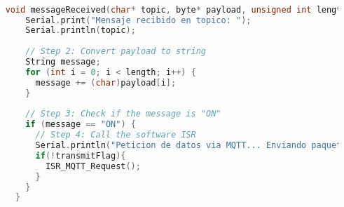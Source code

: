 \begin{lstlisting}[language=C++, caption=Tarea de callback ante recepción de datos MQTT]

    void messageReceived(char* topic, byte* payload, unsigned int length) {
        Serial.print("Mensaje recibido en topico: ");
        Serial.println(topic);
      
        // Step 2: Convert payload to string
        String message;
        for (int i = 0; i < length; i++) {
          message += (char)payload[i];
        }
      
        // Step 3: Check if the message is "ON"
        if (message == "ON") {
          // Step 4: Call the software ISR
          Serial.println("Peticion de datos via MQTT... Enviando paquete Lora si no se estan enviando datos");
          if(!transmitFlag){
            ISR_MQTT_Request();
          }
        }
      }    

    \end{lstlisting}